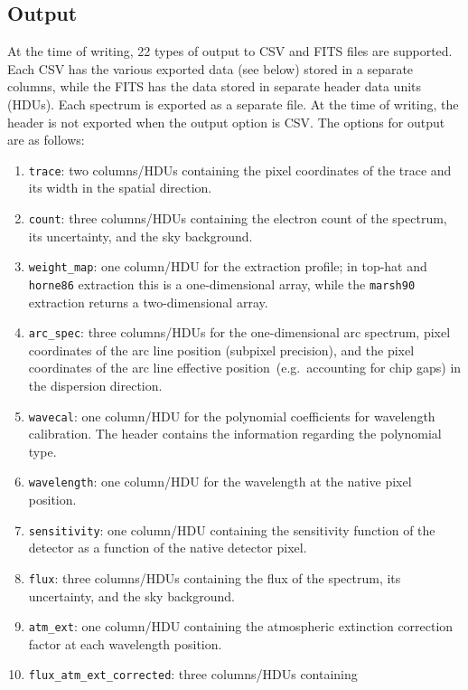 \documentclass[linenumbers, twocolumn]{aastex631}
\begin{document}
\subsection{Output}
At the time of writing, 22 types of output to CSV and FITS files are supported.
Each CSV has the various exported data (see below) stored in a separate columns, while the FITS has
the data stored in separate header data units (HDUs). Each spectrum is exported
as a separate file. At the time of writing, the header is not exported when the
output option is CSV. The options for output are as follows:

\begin{enumerate}
    \item \texttt{trace}: two columns/HDUs containing the pixel coordinates
    of the trace and its width in the spatial direction.
    \item \texttt{count}: three columns/HDUs containing the electron count
    of the spectrum, its uncertainty, and the sky background.
    \item \texttt{weight\_map}: one column/HDU for the extraction profile;
    in top-hat and \texttt{horne86} extraction this is a one-dimensional array,
    while the \texttt{marsh90} extraction returns a two-dimensional array.
    \item \texttt{arc\_spec}: three columns/HDUs for the one-dimensional arc
    spectrum, pixel coordinates of the arc line position (subpixel precision),
    and the pixel coordinates of the arc line effective position~(e.g.\ accounting for chip gaps) in the dispersion direction.
    \item \texttt{wavecal}: one column/HDU for the polynomial coefficients
    for wavelength calibration. The header contains the information regarding the
    polynomial type.
    \item \texttt{wavelength}: one column/HDU for the wavelength at the
    native pixel position.
    \item \texttt{sensitivity}: one column/HDU containing the sensitivity
    function of the detector as a function of the native detector pixel.
    \item \texttt{flux}: three columns/HDUs containing the
    flux of the spectrum, its uncertainty, and the sky background.
    \item \texttt{atm\_ext}: one column/HDU containing the atmospheric
    extinction correction factor at each wavelength position.
    \item \texttt{flux\_atm\_ext\_corrected}: three columns/HDUs containing

\end{enumerate}
\end{document}

